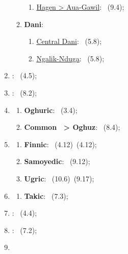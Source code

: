 \begin{enumerate}
\begin{enumerate}
        \begin{enumerate}
            \item \uline{Hagen > Aua-Gawil}: \langnameUmbuUngu\ (9.4);
        \end{enumerate}
        \item \textbf{Dani}:
        \begin{enumerate}
            \item \uline{Central Dani}: \langnameUpperPyramid\ (5.8);
            \item \uline{Ngalik-Nduga}: \langnameJale\ (5.8);
        \end{enumerate}
    \end{enumerate}
    \item \MakeUppercase{\textbf{\langfamily{\famTungusic}}}: \langnameEvenki\ (4.5);
    \item \MakeUppercase{\textbf{\langfamily{\famTupian}}}: \langnameGuarani\ (8.2);
    \item \MakeUppercase{\textbf{\langfamily{\famTurkic}}}
    \begin{enumerate}
        \item \textbf{Oghuric}: \langnameChuvash\ (3.4);
        \item \textbf{Common \famTurkic\ > Oghuz}: \langnameTurkish\ (8.4);
    \end{enumerate}
    \item \MakeUppercase{\textbf{\langfamily{\famUralic}}}
    \begin{enumerate}
        \item \textbf{Finnic}: \langnameEstonian\ (4.12)\EnumComma\langnameFinnish\ (4.12);
        \item \textbf{Samoyedic}: \langnameSelkup\ (9.12);
        \item \textbf{Ugric}: \langnameHungarian\ (10.6)\EnumComma\langnameMansi\ (9.17);
    \end{enumerate}
    \item \MakeUppercase{\textbf{\langfamily{\famUtoAztecan}}}
    \begin{enumerate}
        \item \textbf{Takic}: \langnameLuiseno\ (7.3);
    \end{enumerate}
    \item \MakeUppercase{\textbf{\langfamily{\famYokuts}}}: \langnameValleyYokuts\ (4.4);
    \item \MakeUppercase{\textbf{\langfamily{\famYukiWappo}}}: \langnameWappo\ (7.2);
    \item \MakeUppercase{\textbf{\langlanguages{\famIsolated}}}

\end{enumerate}
